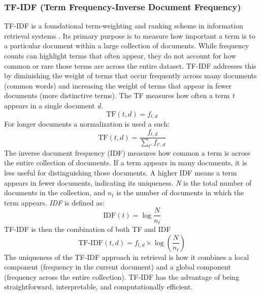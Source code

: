 \subsubsection{TF-IDF (Term Frequency-Inverse Document Frequency)}
TF-IDF is a foundational term-weighting and ranking scheme in information retrieval systems \cite{tf-idf}. Its primary purpose is to measure how important a term is to a particular document within a large collection of documents. While frequency counts can highlight terms that often appear, they do not account for how common or rare those terms are across the entire dataset. TF-IDF addresses this by diminishing the weight of terms that occur frequently across many documents (common words)  and increasing the weight of terms that appear in fewer documents (more distinctive terms).
The \ac{TF} measures how often a term \textit{t} appears in a single document \textit{d}. 
\begin{equation}
    \label{eq:tf} 
    \text{TF}(t,d)=f_{t,d}
\end{equation}
For longer documents a normalization is used a such:
\begin{equation}
    \label{eq:tf(t,d)}
    \text{TF}(t,d) = \frac{f_{t,d}}{\sum_{t'}f_{t',d}}
\end{equation}
The inverse document frequency (IDF) measures how common a term is across the entire collection of documents. If a term appears in many documents, it is less useful for distinguishing those documents. A higher IDF means a term appears in fewer documents, indicating its uniqueness. \textit{N} is the total number of documents in the collection, and $n_t$ is the number of documents in which the term appears. \textit{IDF} is defined as:
\begin{equation}
    \label{eq:idftf}
    \text{IDF}(t)=\log\frac{N}{n_t}
\end{equation}
TF-IDF is then the combination of both TF and IDF
\begin{equation}
    \label{eq:tfidf}
    \text{TF-IDF}(t,d) = f_{t,d} \times \log\left(\frac{N}{n_t}\right)
\end{equation}
The uniqueness of the TF-IDF approach in retrieval is how it combines a local component (frequency in the current document) and a global component (frequency across the entire collection). TF-IDF has the advantage of being straightforward, interpretable, and computationally efficient.

